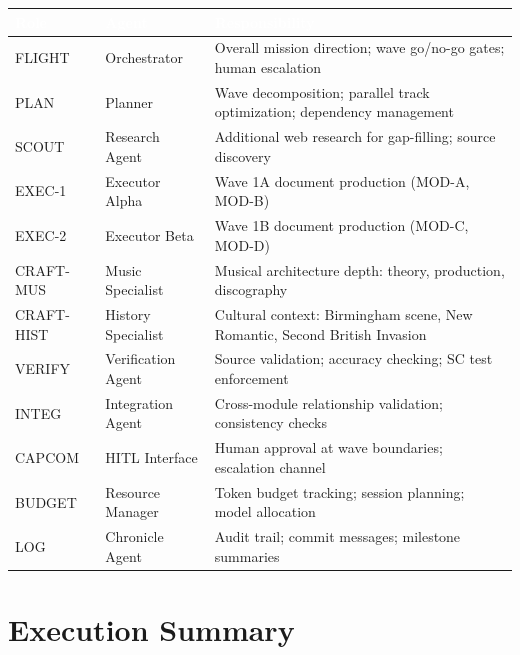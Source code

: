 \documentclass[11pt,letterpaper]{article}
\newcommand{\tableheader}[1]{\textbf{\sffamily\textcolor{white}{#1}}}
\begin{document}
\begin{center}
\begin{tabularx}{\textwidth}{L{2cm}L{3cm}X}
\toprule
{}
\tableheader{Role} & \tableheader{Agent} & \tableheader{Responsibility} \\
\midrule
FLIGHT & Orchestrator & Overall mission direction; wave go/no-go gates; human escalation \\
PLAN & Planner & Wave decomposition; parallel track optimization; dependency management \\
SCOUT & Research Agent & Additional web research for gap-filling; source discovery \\
EXEC-1 & Executor Alpha & Wave 1A document production (MOD-A, MOD-B) \\
EXEC-2 & Executor Beta & Wave 1B document production (MOD-C, MOD-D) \\
CRAFT-MUS & Music Specialist & Musical architecture depth: theory, production, discography \\
CRAFT-HIST & History Specialist & Cultural context: Birmingham scene, New Romantic, Second British Invasion \\
VERIFY & Verification Agent & Source validation; accuracy checking; SC test enforcement \\
INTEG & Integration Agent & Cross-module relationship validation; consistency checks \\
CAPCOM & HITL Interface & Human approval at wave boundaries; escalation channel \\
BUDGET & Resource Manager & Token budget tracking; session planning; model allocation \\
LOG & Chronicle Agent & Audit trail; commit messages; milestone summaries \\
\bottomrule
\end{tabularx}
\end{center}

\section{Execution Summary}
\end{document}
